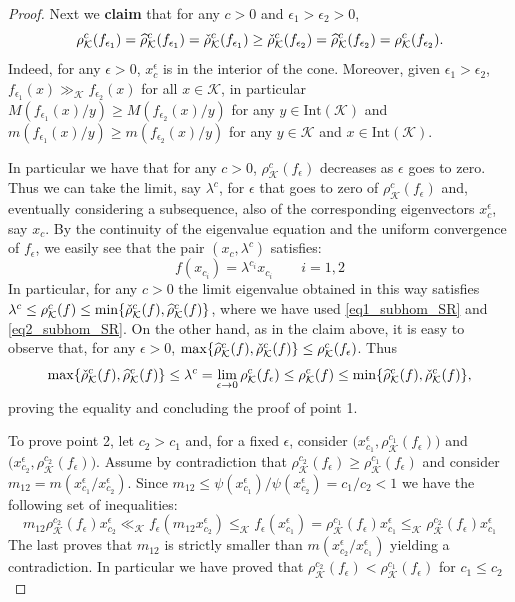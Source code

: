 \documentclass{article}
\newcommand{\cradius}{\rho_{\cone}}
\newcommand{\cgradius}{\widehat{\rho}_{\cone}}
\newcommand{\cdradius}{\Check{\rho}_{\cone}}
\newcommand{\cone}{\mathcal{K}}
\newcommand{\interior}{\mathrm{Int}}
\newcommand{\cleq}{\leq_{\cone}}
\newcommand{\cll}{\ll_{\cone}}
\newcommand{\cgg}{\gg_{\cone}}
\begin{document}
\begin{proof}
%
Next we \textbf{claim} that for any $c>0$ and $\epsilon_1>\epsilon_2>0$, 
\begin{equation}
\cradius^c(f_{\epsilon_1})=\cgradius^c(f_{\epsilon_1})=\cdradius^c(f_{\epsilon_1})\geq \cdradius^c(f_{\epsilon_2})=\cgradius^c(f_{\epsilon_2})=\cradius^c(f_{\epsilon_2}).
\end{equation}
%
Indeed, for any $\epsilon>0$, $x_{c}^\epsilon$ is in the interior of the cone. Moreover, given $\epsilon_1>\epsilon_2$, $f_{\epsilon_1}(x)\cgg f_{\epsilon_2}(x)$ for all $x\in\cone$, in particular $M(f_{\epsilon_1}(x)/y)\geq M(f_{\epsilon_2}(x)/y)$ for any $y\in \interior(\cone)$ and $m(f_{\epsilon_1}(x)/y)\geq m(f_{\epsilon_2}(x)/y)$ for any $y\in \cone$ and $x\in\interior(\cone)$. 
%

%
In particular we have that for any $c>0$, $\cradius^c(f_\epsilon)$ decreases as $\epsilon$ goes to zero. Thus we can take the limit, say $\lambda^c$, for $\epsilon$ that goes to zero of $\cradius^{c}(f_{\epsilon})$ and, eventually considering a subsequence, also of the corresponding eigenvectors $x_{c}^{\epsilon}$, say $x_c$. By the continuity of the eigenvalue equation and the uniform convergence of $f_\epsilon$, we easily see that the pair $(x_c, \lambda^c)$ satisfies:
%
\begin{equation}
   f(x_{c_i})=\lambda^{c_i}x_{c_i} \qquad i=1,2 
\end{equation}
%
In particular, for any $c>0$ the limit eigenvalue obtained in this way satisfies $\lambda^c\leq \cradius^c(f)\leq \min\{\cdradius^c(f),\cgradius^c(f)\}$, where we have used \eqref{eq1_subhom_SR} and \eqref{eq2_subhom_SR}. On the other hand, as in the claim above, it is easy to observe that, for any $\epsilon>0$, $\max\{\cgradius^c(f),\cdradius^c(f)\}\leq \cradius^c(f_{\epsilon})$.
%
Thus 
\begin{equation}
    \max\{\cdradius^c(f),\cgradius^c(f)\} \leq \lambda^c = \lim_{\epsilon\rightarrow 0}\cradius^c(f_{\epsilon})\leq \cradius^c(f)\leq \min\{\cgradius^c(f),\cdradius^c(f)\}, 
\end{equation}
proving the equality and concluding the proof of point 1.
%




To prove point 2, let $c_2>c_1$ and, for a fixed $\epsilon$, consider $\big(x_{c_1}^\epsilon,\cradius^{c_1}(f_{\epsilon})\big)$ and $\big(x_{c_2}^\epsilon,\cradius^{c_2}(f_{\epsilon})\big)$.
%
Assume by contradiction that $\cradius^{c_2}(f_{\epsilon})\geq \cradius^{c_1}(f_{\epsilon})$ and consider $m_{12}=m(x_{c_1}^\epsilon/x_{c_2}^\epsilon)$.
%
Since $m_{12}\leq \psi(x_{c_1}^\epsilon)/\psi(x_{c_2}^\epsilon)=c_1/c_2<1$ we have the following set of inequalities:
%
\begin{equation}
m_{12} \cradius^{c_2}(f_{\epsilon}) x_{c_2}^\epsilon \cll f_{\epsilon}(m_{12} x_{c_2}^\epsilon) \cleq f_{\epsilon}(x_{c_1}^\epsilon) = \cradius^{c_1}(f_{\epsilon})x_{c_1}^\epsilon \cleq \cradius^{c_2}(f_{\epsilon})x_{c_1}^\epsilon  
\end{equation}
%
The last proves that $m_{12}$ is strictly smaller than $m(x_{c_2}^{\epsilon}/x_{c_1}^{\epsilon})$ yielding a contradiction. In particular we have proved that $\cradius^{c_2}(f_{\epsilon})< \cradius^{c_1}(f_{\epsilon})$ for $c_1\leq c_2$
%


\end{proof}
\end{document}
